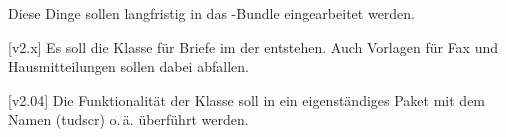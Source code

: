 Diese Dinge sollen langfristig in das \TUDScript-Bundle eingearbeitet werden.


[v2.x]
Es soll die Klasse  für Briefe im \CD der \TnUD entstehen. 
Auch Vorlagen für Fax und Hausmitteilungen sollen dabei abfallen.

[v2.04]
Die Funktionalität der Klasse  soll in ein eigenständiges 
Paket mit dem Namen (tudscr) o.\,ä. überführt werden.

